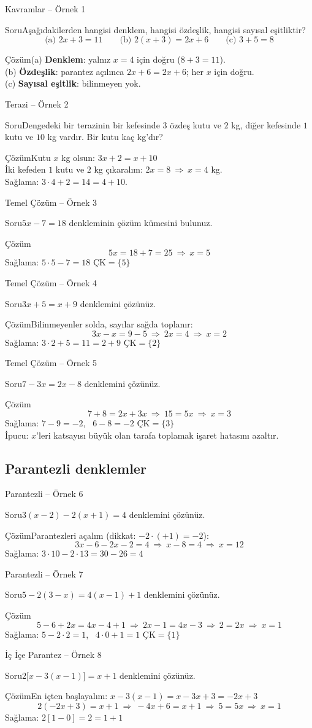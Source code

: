 \documentclass[aspectratio=169,11pt]{beamer}
\newcommand{\soru}[3]{%
\begin{frame}{#1}
  \begin{block}{Soru}\large #2\end{block}
  \pause
  \begin{exampleblock}{Çözüm}\large #3\end{exampleblock}
\end{frame}}
\begin{document}
\soru{Kavramlar -- Örnek 1}
{Aşağıdakilerden hangisi denklem, hangisi özdeşlik, hangisi sayısal eşitliktir?
\[\text{(a) } 2x+3=11\qquad \text{(b) } 2(x+3)=2x+6\qquad \text{(c) } 3+5=8\]}
{(a) \textbf{Denklem}: yalnız \(x=4\) için doğru (\(8+3=11\)).\\[3pt]
(b) \textbf{Özdeşlik}: parantez açılınca \(2x+6=2x+6\); her \(x\) için doğru.\\[3pt]
(c) \textbf{Sayısal eşitlik}: bilinmeyen yok.}

\soru{Terazi -- Örnek 2}
{Dengedeki bir terazinin bir kefesinde \(3\) özdeş kutu ve \(2\) kg, diğer kefesinde \(1\) kutu ve \(10\) kg vardır. Bir kutu kaç kg'dır?}
{Kutu \(x\) kg olsun: \quad \(3x+2=x+10\)\\[3pt]
İki kefeden \(1\) kutu ve \(2\) kg çıkaralım: \quad \(2x=8\ \Rightarrow\ x=4\) kg.\\[3pt]
Sağlama: \(3\cdot 4+2=14=4+10\).}

\soru{Temel Çözüm -- Örnek 3}
{\(5x-7=18\) denkleminin çözüm kümesini bulunuz.}
{\[5x=18+7=25\ \Rightarrow\ x=5\]
Sağlama: \(5\cdot 5-7=18\) \checkmark \qquad \(\text{ÇK}=\{5\}\)}

\soru{Temel Çözüm -- Örnek 4}
{\(3x+5=x+9\) denklemini çözünüz.}
{Bilinmeyenler solda, sayılar sağda toplanır:
\[3x-x=9-5\ \Rightarrow\ 2x=4\ \Rightarrow\ x=2\]
Sağlama: \(3\cdot 2+5=11=2+9\) \checkmark \qquad \(\text{ÇK}=\{2\}\)}

\soru{Temel Çözüm -- Örnek 5}
{\(7-3x=2x-8\) denklemini çözünüz.}
{\[7+8=2x+3x\ \Rightarrow\ 15=5x\ \Rightarrow\ x=3\]
Sağlama: \(7-9=-2\), \ \(6-8=-2\) \checkmark \qquad \(\text{ÇK}=\{3\}\)\\[3pt]
İpucu: \(x\)'leri katsayısı büyük olan tarafa toplamak işaret hatasını azaltır.}

\subsection{Parantezli denklemler}
\soru{Parantezli -- Örnek 6}
{\(3(x-2)-2(x+1)=4\) denklemini çözünüz.}
{Parantezleri açalım (dikkat: \(-2\cdot(+1)=-2\)):
\[3x-6-2x-2=4\ \Rightarrow\ x-8=4\ \Rightarrow\ x=12\]
Sağlama: \(3\cdot 10-2\cdot 13=30-26=4\) \checkmark}

\soru{Parantezli -- Örnek 7}
{\(5-2(3-x)=4(x-1)+1\) denklemini çözünüz.}
{\[5-6+2x=4x-4+1\ \Rightarrow\ 2x-1=4x-3\ \Rightarrow\ 2=2x\ \Rightarrow\ x=1\]
Sağlama: \(5-2\cdot 2=1\), \ \(4\cdot 0+1=1\) \checkmark \qquad \(\text{ÇK}=\{1\}\)}

\soru{İç İçe Parantez -- Örnek 8}
{\(2\big[x-3(x-1)\big]=x+1\) denklemini çözünüz.}
{En içten başlayalım: \(x-3(x-1)=x-3x+3=-2x+3\)
\[2(-2x+3)=x+1\ \Rightarrow\ -4x+6=x+1\ \Rightarrow\ 5=5x\ \Rightarrow\ x=1\]
Sağlama: \(2[1-0]=2=1+1\) \checkmark}
\end{document}
